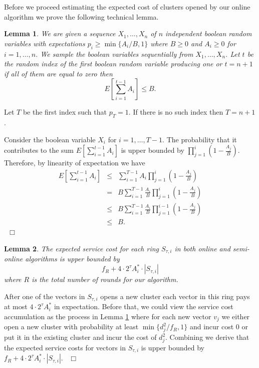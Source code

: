 \documentclass{article}
\newtheorem{lemma}{Lemma}
\newenvironment{proof}{\medskip\noindent {\bf Proof.}}{~\hfill$\Box$\medskip}
\begin{document}
Before we proceed estimating the expected cost of clusters opened by our online algorithm we prove the following technical lemma.
\begin{lemma}\label{random}
We are given a sequence $X_1,\dots, X_n$ of $n$ independent boolean random variables with expectations  $p_i\ge \min\{A_i/B,1\}$ where $B\ge 0$ and $A_i\ge 0$   for $i=1,\dots,n$.  We sample the boolean variables sequentially from
$X_1,\dots, X_n$.
Let $t$ be the random index of the first boolean random variable producing one or $t=n+1$ if all of them are equal to zero  then
$$E\left[\sum_{i=1}^{t-1}A_i\right]\le B.$$
\end{lemma}
\begin{proof}
Let $T$ be the first index such that $p_T=1$. If there is no such index then $T=n+1$.

Consider the boolean variable $X_i$ for $i=1,\dots, T-1$. The probability that it contributes to the sum $E\left[\sum_{i=1}^{t-1}A_i\right]$ is upper bounded by  $\prod_{j=1}^i\left(1-\frac{A_j}{B}\right)$. Therefore, by linearity of expectation we have
\begin{eqnarray*}
E\left[\sum_{i=1}^{t-1}A_i\right]&\le& \sum_{i=1}^{T-1}A_i\prod_{j=1}^i\left(1-\frac{A_j}{B}\right)\\
&=&B\sum_{i=1}^{T-1}\frac{A_i}{B}\prod_{j=1}^i\left(1-\frac{A_j}{B}\right)\\
&\le& B \sum_{i=1}^{T-1}\frac{A_i}{B}\prod_{j=1}^{i-1}\left(1-\frac{A_j}{B}\right)\\
&\le& B.
\end{eqnarray*}
\end{proof}
\begin{lemma}\label{ring}
The expected service cost for each ring $S_{\tau,i}$ in both online and semi-online algorithms is upper bounded by 
$$f_R+ 4\cdot 2^{\tau}A_i^*\cdot |S_{\tau,i}|$$
where $R$ is the total number of rounds for our algorithm.
\end{lemma}
\begin{proof}
After one of the vectors in $S_{\tau,i}$ opens a new cluster each  vector in this ring pays at most $4\cdot 2^{\tau}A_i^*$ in expectation. Before that, we could view the service cost accumulation as the process in Lemma \ref{random} where for each new vector $v_j$ we either open a new cluster with probability at least  $\min\{d^2_j/f_R,1\}$ and incur cost $0$ or put it in the existing cluster and incur the cost of $d^2_j$. Combining we derive that the expected service costs for vectors in $S_{\tau,i}$ is upper bounded by $f_R+ 4\cdot 2^{\tau}A_i^*\cdot |S_{\tau,i}|$.
\end{proof}
\end{document}
